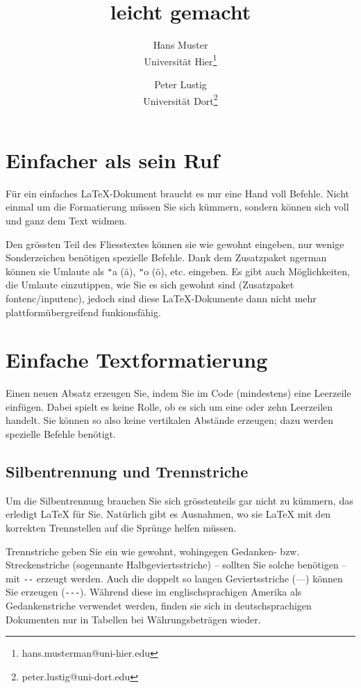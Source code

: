 \documentclass[11pt, a4paper,draft]{article}
\title{\ltx{} leicht gemacht}
\author{Hans Muster\\ Universität Hier\thanks{hans.musterman@uni-hier.edu} \and Peter Lustig\\Universität Dort\thanks{peter.lustig@uni-dort.edu}}
\newcommand{\ltx}{\LaTeX}
\begin{document}
\maketitle
\tableofcontents
\newpage

\section{Einfacher als sein Ruf}

Für ein einfaches \ltx-Dokument braucht es nur eine Hand voll Befehle. Nicht einmal um die Formatierung müssen Sie sich kümmern, sondern können sich voll und ganz dem Text widmen.

Den grössten Teil des Fliesstextes können sie wie gewohnt eingeben, nur wenige Sonderzeichen benötigen spezielle Befehle. Dank dem Zusatzpaket ngerman können sie Umlaute als \verb+"+a (ä), \verb+"+o (ö), etc. eingeben. Es gibt auch Möglichkeiten, die Umlaute einzutippen, wie Sie es sich gewohnt sind (Zusatzpaket fontenc/inputenc), jedoch sind diese \ltx-Dokumente dann nicht mehr plattformübergreifend funkionsfähig.

\section{Einfache Textformatierung}

Einen neuen Absatz erzeugen Sie, indem Sie im Code (mindestens) eine Leerzeile einfügen. Dabei spielt es keine Rolle, ob es sich um eine oder zehn Leerzeilen handelt. Sie können so also keine vertikalen Abstände erzeugen; dazu werden spezielle Befehle benötigt.

\subsection{Silbentrennung und Trennstriche}

Um die Silbentrennung brauchen Sie sich grösstenteils gar nicht zu kümmern, das erledigt \ltx{} für Sie. Natürlich gibt es Ausnahmen, wo sie \ltx{} mit den korrekten Trennstellen auf die Sprünge helfen müssen.

Trennstriche geben Sie ein wie gewohnt, wohingegen Gedanken- bzw. Streckenstriche (sogennante Halbgeviertsstriche) -- sollten Sie solche benötigen -- mit \verb+--+ erzeugt werden. Auch die doppelt so langen Geviertsstriche (---) können Sie erzeugen (\verb+---+). Während diese im englischsprachigen Amerika als Gedankenstriche verwendet werden, finden sie sich in deutschsprachigen Dokumenten nur in Tabellen bei Währungsbeträgen wieder.
\end{document}
